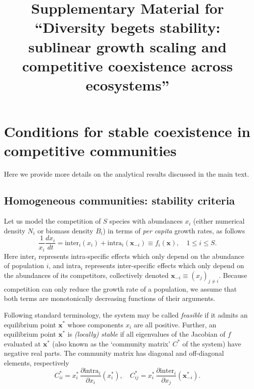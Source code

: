 \documentclass[12pt]{article}
\title{Supplementary Material for\\ ``Diversity begets stability: sublinear growth scaling and competitive coexistence across ecosystems''}
\newcommand{\inter}{\textrm{inter}}
\newcommand{\intra}{\textrm{intra}}
\begin{document}
\appendix

\maketitle




\section{Conditions for stable coexistence in competitive communities}

Here we provide more details on the analytical results discussed in the main text. 

\subsection{Homogeneous communities: stability criteria}\label{homogeneous-stability}


Let us model the competition of $S$ species with abundances $x_i$ (either numerical density $N_i$ or biomass density $B_i$) in terms of \emph{per capita} growth rates, as follows
\begin{equation}\label{model}
\frac{1}{x_i}\frac{dx_i}{dt} = \inter_i(x_i) + \intra_i(\mathbf x_{-i})\equiv f_i(\mathbf x), \quad 1\leq i\leq S .
\end{equation}
Here $\inter_i$ represents intra-specific effects which only depend on the abundance of population $i$, and  $\intra_i$ represents inter-specific effects which only depend on the abundances of its competitors, collectively denoted $\mathbf x_{-i}\equiv (x_j)_{j \neq i}$. Because competition can only reduce the growth rate of a population, we assume that both terms are monotonically decreasing functions of their arguments. 

Following standard terminology, the system may be called \emph{feasible} if it admits an equilibrium point $\mathbf x^*$ whose components $x_i$ are all positive. Further, an equilibrium point $\mathbf x^*$ is \emph{(locally) stable} if all eigenvalues of the Jacobian of $f$ evaluated at $\mathbf x^*$ (also known as the `community matrix' $C^*$ of the system) have negative real parts. 
The community matrix has diagonal and off-diagonal elements, respectively 
\begin{equation}\label{community-matrix}
    C^*_{ii} = x_i^*\, \frac{\partial \intra_i}{\partial x_i}(x_i^*), \quad C^*_{ij} = x_i^*\, \frac{\partial \inter_i}{\partial x_j}(\mathbf x_{-i}^*).
\end{equation}
\end{document}
